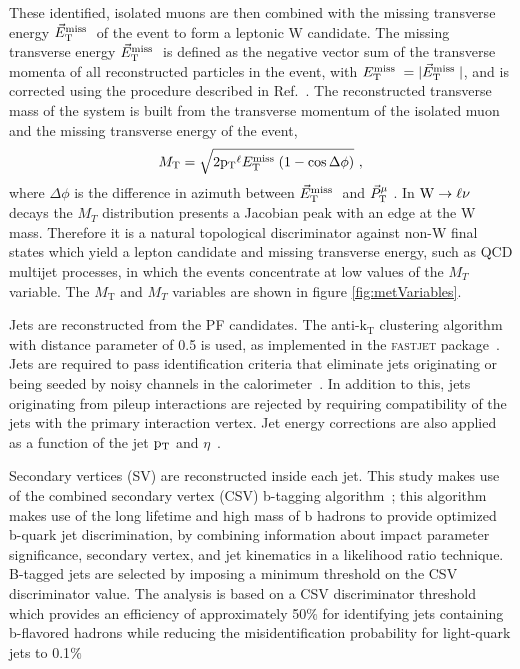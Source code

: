 These identified, isolated muons are then combined with the missing transverse 
energy $\vec{E}_\mathrm{T}^{\mathrm{miss}}\;$ of the event to form a leptonic W candidate. 
The missing transverse energy $\vec{E}_\mathrm{T}^{\mathrm{miss}}\;$ is defined as
the negative vector sum of the
transverse momenta of all reconstructed particles in the event, with $E_\mathrm{T}^{\mathrm{miss}}\; = |\vec{E}_\mathrm{T}^{\mathrm{miss}}\;|$,
and is corrected using the procedure 
described in Ref.~\cite{WZCMS:2010}.
The reconstructed transverse mass of the system is built from the transverse momentum of the isolated muon 
and the missing transverse energy of the event, 
\begin{equation*} 
M_\mathrm{T} = \sqrt{2 \mathrm{p_{T}}^{\ell} E_\mathrm{T}^{\mathrm{miss}}\; (1-\cos \Delta \phi)}\ ,
\nonumber
\end{equation*}
where
$\Delta \phi$
is the difference in azimuth between $\vec{E}_\mathrm{T}^{\mathrm{miss}}\;$ and $\vec{P}_\mathrm{T}^{\mu}\;$. In $\mathrm{W}\rightarrow \ell\nu$ decays the $M_T$ distribution presents a Jacobian peak 
with an edge at the W mass. Therefore it is a natural topological discriminator against non-W final states which yield a lepton candidate and
missing transverse energy, such as QCD multijet processes, 
in which the events concentrate at low values of the $M_T$ variable. The 
$M_\mathrm{T}$ and $M_{T}$ variables are shown in figure \ref{fig:metVariables}.

Jets are reconstructed from the PF candidates.
The anti-$\mathrm{k_T}$
clustering algorithm~\cite{Cacciari:2008gp} with distance parameter of 0.5
is used, as implemented in the \textsc{fastjet}
package~\cite{fastjet1,fastjet2}. 
Jets are required to pass identification
criteria that eliminate jets originating or being seeded by
noisy channels in the calorimeter~\cite{Chatrchyan:2009hy}.
In addition to this, jets originating from pileup interactions are
rejected by requiring compatibility of the jets 
with the primary interaction vertex. 
Jet energy corrections are also applied as a function of the jet
$\mathrm{p_{T}}$ and $\eta$~\cite{cmsJEC}.

Secondary vertices (SV) are reconstructed inside each jet.
This study makes use of the combined secondary vertex (CSV) b-tagging algorithm~\cite{refCSV};
this algorithm makes use of the
long lifetime and high mass of b hadrons
to provide optimized 
b-quark jet discrimination,
by combining information 
about impact parameter significance, secondary vertex, and 
jet kinematics in a likelihood ratio technique. B-tagged jets are selected by imposing a 
minimum threshold on the CSV discriminator value.
The analysis is based on a CSV
discriminator threshold
which provides an efficiency of approximately 50$\%$  for identifying
jets containing b-flavored hadrons while reducing the misidentification probability for light-quark jets to 0.1$\%$~\cite{BTAGNOTE}


